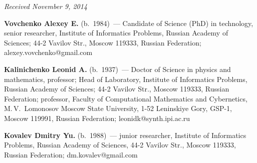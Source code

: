 \vspace*{-6pt}

\hfill{\small\textit{Received November 9, 2014}}

\vspace*{-18pt}

\Contr

\noindent
\textbf{Vovchenko Alexey E.} (b.\ 1984)~---
Candidate of Science (PhD) in technology, senior researcher,
Institute of Informatics Problems, Russian Academy of Sciences;
44-2 Vavilov Str., Moscow 119333, Russian Federation;
alexey.vovchenko@gmail.com

\vspace*{3pt}

\noindent
\textbf{Kalinichenko Leonid A.} (b.\ 1937)~---
Doctor of Science in physics and mathematics, professor; Head of Laboratory,
Institute of Informatics Problems,
Russian Academy of Sciences;
44-2 Vavilov Str., Moscow 119333, Russian Federation;
professor, Faculty of Computational Mathematics and Cybernetics,
M.\,V.~Lomonosov Moscow State University, 1-52  Leninskiye Gory, GSP-1, Moscow 119991, Russian Federation;
 leonidk@synth.ipi.ac.ru

\vspace*{3pt}

\noindent
\textbf{Kovalev Dmitry  Yu.} (b.\ 1988)~---
junior researcher, Institute of Informatics Problems,
Russian Academy of Sciences, 44-2 Vavilov Str., Moscow 119333, Russian Federation;
 dm.kovalev@gmail.com




\label{end\stat}

\renewcommand{\bibname}{\protect\rm Литература}
